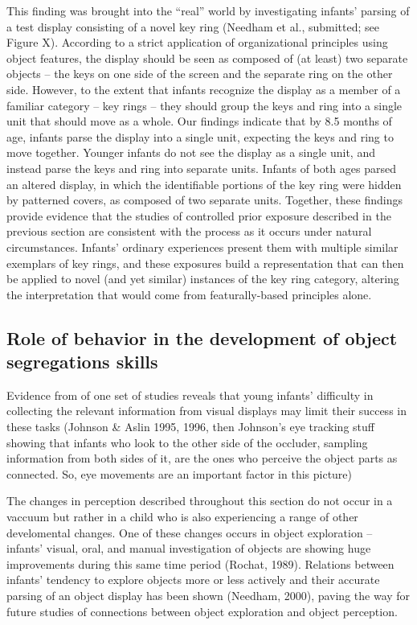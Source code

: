 This finding was brought into the ``real'' world by investigating
infants' parsing of a test display consisting of a novel key
ring (Needham et al., submitted; see Figure X).  According to a strict
application of organizational principles using object features, the
display should be seen as composed of (at least) two separate
objects -- the keys on one side of the screen and the separate
ring on the other side.  However, to the extent that infants recognize
the display as a member of a familiar category -- key
rings -- they should group the keys and ring into a single unit
that should move as a whole.  Our findings indicate that by 8.5 months
of age, infants parse the display into a single unit, expecting the
keys and ring to move together.  Younger infants do not see the
display as a single unit, and instead parse the keys and ring into
separate units.  Infants of both ages parsed an altered display, in
which the identifiable portions of the key ring were hidden by
patterned covers, as composed of two separate units.  Together, these
findings provide evidence that the studies of controlled prior
exposure described in the previous section are consistent with the
process as it occurs under natural circumstances.  Infants'
ordinary experiences present them with multiple similar exemplars of
key rings, and these exposures build a representation that can then be
applied to novel (and yet similar) instances of the key ring category,
altering the interpretation that would come from featurally-based
principles alone.




\subsection{Role of behavior in the development of object segregations skills}

Evidence from of one set of studies reveals that young
infants' difficulty in collecting the relevant information
from visual displays may limit their success in these tasks (Johnson \&
Aslin 1995, 1996, then Johnson's eye tracking stuff showing
that infants who look to the other side of the occluder, sampling
information from both sides of it, are the ones who perceive the
object parts as connected.  So, eye movements are an important factor
in this picture)

The changes in perception described throughout this section
do not occur in a vaccuum but rather in a
child who is also experiencing a range of other develomental changes.
One of these changes occurs in object
exploration -- infants' visual, oral, and manual
investigation of objects are showing huge improvements during this
same time period (Rochat, 1989).  Relations between infants'
tendency to explore objects more or less actively and their accurate
parsing of an object display has been shown (Needham, 2000), paving
the way for future studies of connections between object exploration
and object perception.





